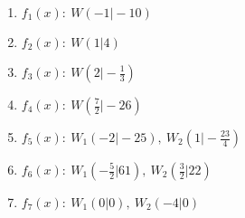 \begin{Answer}[ref=wendepunkteA1]
	\begin{enumerate}[label=\alph*)]
		\item \(f_1(x):\ W\left(-1\vert -10\right)\)
		\item \(f_2(x):\ W\left(1\vert 4\right)\)
		\item \(f_3(x):\ W\left(2\vert -\frac{1}{3}\right)\)
		\item \(f_4(x):\ W\left(\frac{7}{2}\vert -26\right)\)
		\item \(f_5(x):\ W_1\left(-2\vert -25\right),\ W_2\left(1\vert -\frac{23}{4}\right)\)
		\item \(f_6(x):\ W_1\left(-\frac{5}{2}\vert 61\right),\ W_2\left(\frac{3}{2}\vert 22\right)\)
		\item \(f_7(x):\ W_1\left(0\vert 0\right),\ W_2\left(-4\vert 0\right)\)
	\end{enumerate}
\end{Answer}